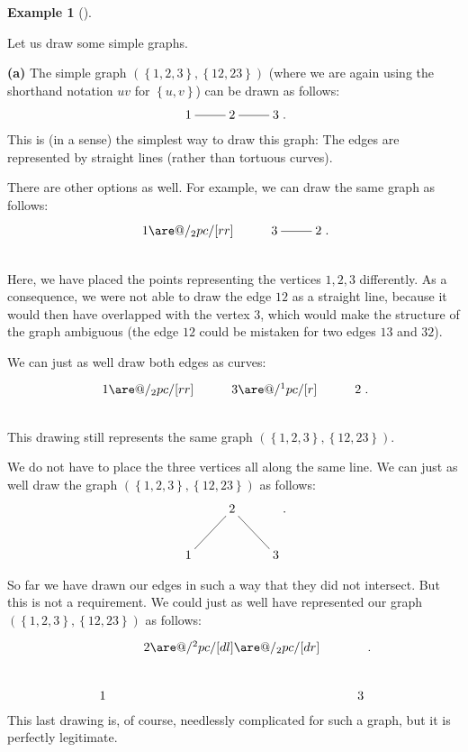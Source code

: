\documentclass[numbers=enddot,12pt,final,onecolumn,notitlepage]{scrartcl}%
\makeatletter
\theoremstyle{definition}
\newtheorem{exam}[theo]{Example}
\newenvironment{example}[1][]
{\begin{exam}[#1]\begin{leftbar}}
{\end{leftbar}\end{exam}}
\newcommand{\set}[1]{\left\{ #1 \right\}}
\newcommand{\tup}[1]{\left( #1 \right)}
\newcommand{\are}{\ar@{-}}
\makeatother
\begin{document}
\begin{example} \label{exa.intro.draw}
Let us draw some simple graphs.

\textbf{(a)} The simple graph $\tup{\set{1,2,3}, \set{12, 23}}$ (where
we are again using the shorthand notation $uv$ for $\set{u,v}$) can be
drawn as follows:
\[
\xymatrix{ 1 \are[r] & 2 \are[r] & 3 }.
\]
This is (in a sense) the simplest way to draw this graph: The edges
are represented by straight lines (rather than tortuous curves).

There are other options as well. For example, we can draw the same
graph as follows:
\begin{align*}
\xymatrix{ 1 \are@/_2pc/[rr] & 3 \are[r] & 2 }. \\
\phantom{a} %
\end{align*}
Here, we have placed the points representing the vertices $1,2,3$
differently. As a consequence, we were not able to draw the edge $12$
as a straight line, because it would then have overlapped with the
vertex $3$, which would make the structure of the graph ambiguous
(the edge $12$ could be mistaken for two edges $13$ and $32$).

We can just as well draw both edges as curves:
\begin{align*}
\xymatrix{ 1 \are@/_2pc/[rr] & 3 \are@/^1pc/[r] & 2 }. \\
\phantom{a} %
\end{align*}
This drawing still represents the same graph
$\tup{\set{1,2,3}, \set{12, 23}}$.

We do not have to place the three vertices all along the same line.
We can just as well draw the graph $\tup{\set{1,2,3}, \set{12, 23}}$
as follows:
\[
\xymatrix{
& 2 \are[dl] \are[dr] \\
1 & & 3
} .
\]

So far we have drawn our edges in such a way that they did not
intersect. But this is not a requirement. We could just as well have
represented our graph $\tup{\set{1,2,3}, \set{12, 23}}$
as follows:
\[
\xymatrix{
& 2 \are@/^2pc/[dl] \are@/_2pc/[dr] \\
1 & & 3
} .
\]
This last drawing is, of course, needlessly complicated for such a
graph, but it is perfectly legitimate.


\end{example}
\end{document}

